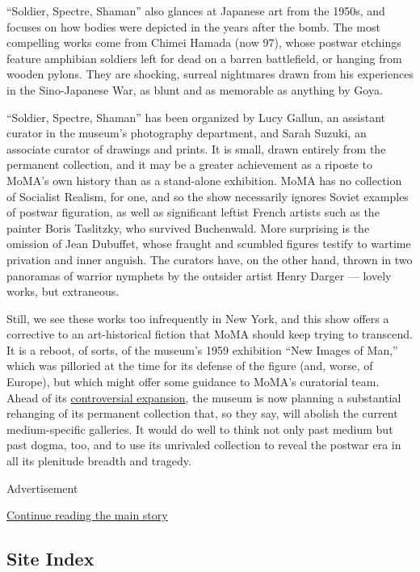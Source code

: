 ``Soldier, Spectre, Shaman'' also glances at Japanese art from the
1950s, and focuses on how bodies were depicted in the years after the
bomb. The most compelling works come from Chimei Hamada (now 97), whose
postwar etchings feature amphibian soldiers left for dead on a barren
battlefield, or hanging from wooden pylons. They are shocking, surreal
nightmares drawn from his experiences in the Sino-Japanese War, as blunt
and as memorable as anything by Goya.

``Soldier, Spectre, Shaman'' has been organized by Lucy Gallun, an
assistant curator in the museum's photography department, and Sarah
Suzuki, an associate curator of drawings and prints. It is small, drawn
entirely from the permanent collection, and it may be a greater
achievement as a riposte to MoMA's own history than as a stand-alone
exhibition. MoMA has no collection of Socialist Realism, for one, and so
the show necessarily ignores Soviet examples of postwar figuration, as
well as significant leftist French artists such as the painter Boris
Taslitzky, who survived Buchenwald. More surprising is the omission of
Jean Dubuffet, whose fraught and scumbled figures testify to wartime
privation and inner anguish. The curators have, on the other hand,
thrown in two panoramas of warrior nymphets by the outsider artist Henry
Darger --- lovely works, but extraneous.

Still, we see these works too infrequently in New York, and this show
offers a corrective to an art-historical fiction that MoMA should keep
trying to transcend. It is a reboot, of sorts, of the museum's 1959
exhibition ``New Images of Man,'' which was pilloried at the time for
its defense of the figure (and, worse, of Europe), but which might offer
some guidance to MoMA's curatorial team. Ahead of its
\href{http://www.nytimes3xbfgragh.onion/2014/01/09/arts/design/a-grand-redesign-of-moma-does-not-spare-a-notable-neighbor.html}{controversial
expansion}, the museum is now planning a substantial rehanging of its
permanent collection that, so they say, will abolish the current
medium-specific galleries. It would do well to think not only past
medium but past dogma, too, and to use its unrivaled collection to
reveal the postwar era in all its plenitude breadth and tragedy.

Advertisement

\protect\hyperlink{after-bottom}{Continue reading the main story}

\hypertarget{site-index}{%
\subsection{Site Index}\label{site-index}}


